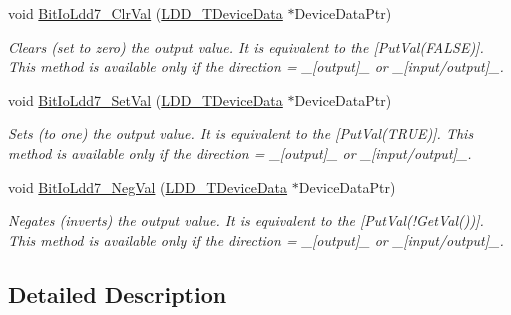 \begin{DoxyCompactItemize}
void \hyperlink{group___bit_io_ldd7__module_ga6eafafb0a2c30b4347462e6ff00d6f45}{Bit\-Io\-Ldd7\-\_\-\-Clr\-Val} (\hyperlink{group___p_e___types__module_gac5cf1362f1f0e3a2ce71b1bf2276d091}{L\-D\-D\-\_\-\-T\-Device\-Data} $\ast$Device\-Data\-Ptr)
\begin{DoxyCompactList}\small\item\em Clears (set to zero) the output value. It is equivalent to the \mbox{[}Put\-Val(\-F\-A\-L\-S\-E)\mbox{]}. This method is available only if the direction = \-\_\-\mbox{[}output\mbox{]}\-\_\- or \-\_\-\mbox{[}input/output\mbox{]}\-\_\-. \end{DoxyCompactList}\item 
void \hyperlink{group___bit_io_ldd7__module_gaae11392cdaf0061ec255e1de58e509f5}{Bit\-Io\-Ldd7\-\_\-\-Set\-Val} (\hyperlink{group___p_e___types__module_gac5cf1362f1f0e3a2ce71b1bf2276d091}{L\-D\-D\-\_\-\-T\-Device\-Data} $\ast$Device\-Data\-Ptr)
\begin{DoxyCompactList}\small\item\em Sets (to one) the output value. It is equivalent to the \mbox{[}Put\-Val(\-T\-R\-U\-E)\mbox{]}. This method is available only if the direction = \-\_\-\mbox{[}output\mbox{]}\-\_\- or \-\_\-\mbox{[}input/output\mbox{]}\-\_\-. \end{DoxyCompactList}\item 
void \hyperlink{group___bit_io_ldd7__module_gacf8b1f0a63a31fdfd3cd3bb2589414b1}{Bit\-Io\-Ldd7\-\_\-\-Neg\-Val} (\hyperlink{group___p_e___types__module_gac5cf1362f1f0e3a2ce71b1bf2276d091}{L\-D\-D\-\_\-\-T\-Device\-Data} $\ast$Device\-Data\-Ptr)
\begin{DoxyCompactList}\small\item\em Negates (inverts) the output value. It is equivalent to the \mbox{[}Put\-Val(!\-Get\-Val())\mbox{]}. This method is available only if the direction = \-\_\-\mbox{[}output\mbox{]}\-\_\- or \-\_\-\mbox{[}input/output\mbox{]}\-\_\-. \end{DoxyCompactList}\end{DoxyCompactItemize}


\subsection{Detailed Description}


